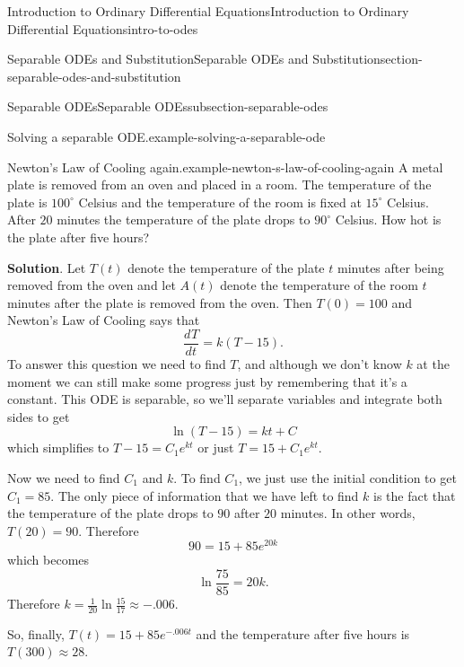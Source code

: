 \documentclass[oneside,10pt,]{book}
\numberwithin{equation}{section}
\newcommand{\dv}[3][]{\dfrac{d^{#1} #2}{d #3^{#1}}}
\begin{document}
\begin{chapterptx}{Introduction to Ordinary Differential Equations}{}{Introduction to Ordinary Differential Equations}{}{}{intro-to-odes}
\begin{sectionptx}{Separable ODEs and Substitution}{}{Separable ODEs and Substitution}{}{}{section-separable-odes-and-substitution}
\begin{subsectionptx}{Separable ODEs}{}{Separable ODEs}{}{}{subsection-separable-odes}
\begin{example}{Solving a separable ODE.}{example-solving-a-separable-ode}
\begin{equation*}
\end{equation*}
%
\end{example}
\begin{example}{Newton's Law of Cooling again.}{example-newton-s-law-of-cooling-again}%
\hypertarget{p-57}{}%
A metal plate is removed from an oven and placed in a room. The temperature of the plate is \(100^{\circ}\) Celsius and the temperature of the room is fixed at \(15^{\circ}\) Celsius. After \(20\) minutes the temperature of the plate drops to \(90^{\circ}\) Celsius. How hot is the plate after five hours?%
\par\smallskip%
\noindent\textbf{Solution}.\hypertarget{solution-10}{}\quad%
\hypertarget{p-58}{}%
Let \(T(t)\) denote the temperature of the plate \(t\) minutes after being removed from the oven and let \(A(t)\) denote the temperature of the room \(t\) minutes after the plate is removed from the oven. Then \(T(0) = 100\) and Newton's Law of Cooling says that%
%
\begin{equation*}
\dv{T}{t} = k(T-15).
\end{equation*}
\hypertarget{p-59}{}%
To answer this question we need to find \(T\), and although we don't know \(k\) at the moment we can still make some progress just by remembering that it's a constant. This ODE is separable, so we'll separate variables and integrate both sides to get%
\begin{equation*}
\ln(T-15) = kt+C
\end{equation*}
which simplifies to \(T-15 = C_{1}e^{kt}\) or just \(T = 15+C_{1}e^{kt}\).%
\par
\hypertarget{p-60}{}%
Now we need to find \(C_{1}\) and \(k\). To find \(C_{1}\), we just use the initial condition to get \(C_{1} = 85\). The only piece of information that we have left to find \(k\) is the fact that the temperature of the plate drops to \(90\) after \(20\) minutes. In other words, \(T(20) = 90\). Therefore%
\begin{equation*}
90 = 15+85e^{20k}
\end{equation*}
which becomes%
\begin{equation*}
\ln\frac{75}{85} = 20k\text{.}
\end{equation*}
Therefore \(k = \frac{1}{20}\ln\frac{15}{17}\approx-.006.\)%
\par
\hypertarget{p-61}{}%
So, finally, \(T(t) = 15+85e^{-.006t}\) and the temperature after five hours is \(T(300)\approx28\).%
\end{example}
\end{subsectionptx}
%

\end{sectionptx}
\end{chapterptx}
\end{document}
